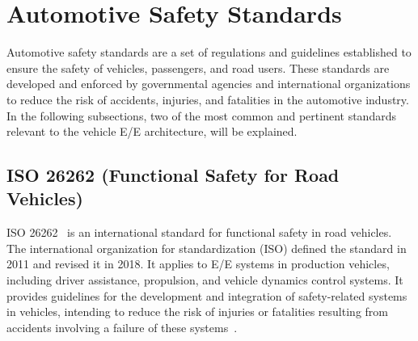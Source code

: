 







    
    
    \section{Automotive Safety Standards}
    Automotive safety standards are a set of regulations and guidelines established to ensure the safety of vehicles, passengers, and road users. These standards are developed and enforced by governmental agencies and international organizations to reduce the risk of accidents, injuries, and fatalities in the automotive industry. In the following subsections, two of the most common and pertinent standards relevant to the vehicle E/E architecture, will be explained.
    
    
    \subsection{ISO 26262 (Functional Safety for Road Vehicles)}
    
   ISO 26262~\cite{iso26262} is an international standard for functional safety in road vehicles. The international organization for standardization (ISO) defined the standard in 2011 and revised it in 2018. It applies to E/E systems in production vehicles, including driver assistance, propulsion, and vehicle dynamics control systems. It provides guidelines for the development and integration of safety-related systems in vehicles, intending to reduce the risk of injuries or fatalities resulting from accidents involving a failure of these systems~\cite{askaripoor2022architecture, iso26262, 9565115}.
    
